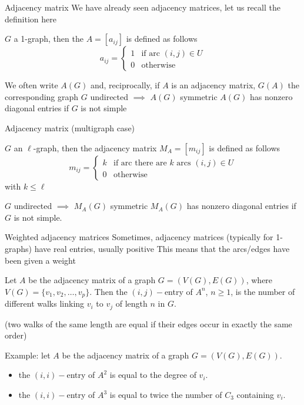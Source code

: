 \documentclass[aspectratio=43]{beamer}
\begin{document}
	
	
	
\begin{frame}{Adjacency matrix}
	We have already seen adjacency matrices, let us recall the definition here
	\begin{definition}
		$G$ a 1-graph, then the  $A=[a_{ij}]$ is defined as follows
		\[
		a_{ij} = \begin{cases}
			1 & \text{if arc } (i,j)\in U\\
			0 & \text{otherwise}
		\end{cases}
		\]
	\end{definition}
	\vfill
	We often write $A(G)$ and, reciprocally, if $A$ is an adjacency matrix, $G(A)$ the corresponding graph
	\vfill
	$G$ undirected $\implies$ $A(G)$ symmetric
	\vfill
	$A(G)$ has nonzero diagonal entries if $G$ is not simple
\end{frame}

\begin{frame}{Adjacency matrix (multigraph case)}
	\begin{definition}
		$G$ an $\ell$-graph, then the adjacency matrix $M_A=[m_{ij}]$ is defined as follows
		\[
		m_{ij} = \begin{cases}
			k & \text{if arc there are $k$ arcs } (i,j)\in U\\
			0 & \text{otherwise}
		\end{cases}
		\]
		with $k\leq \ell$
	\end{definition}
	\vfill
	$G$ undirected $\implies$ $M_A(G)$ symmetric
	\vfill
	$M_A(G)$ has nonzero diagonal entries if $G$ is not simple.
\end{frame}

\begin{frame}{Weighted adjacency matrices}
	Sometimes, adjacency matrices (typically for 1-graphs) have real entries, usually positive
	\vfill
	This means that the arcs/edges have been given a weight
\end{frame}


\begin{frame}
	\begin{theorem}
		Let $A$ be the adjacency matrix of a graph $G=(V(G),E(G))$, where $V(G)=\{v_1,v_2, \dots , v_p\}$. Then the $(i,j)-$entry of $A^n$, $n\geq 1$, is the number of different walks linking $v_i$ to $v_j$ of length $n$ in $G$.
	\end{theorem}
	(two walks of the same length are equal if their edges occur in exactly the same order)
	
	Example: let $A$ be the adjacency matrix of a graph $G=(V(G),E(G))$. 
	\begin{itemize}
		\item the $(i,i)-$entry of $A^2$ is equal to the degree of $v_i$.
		\item the $(i,i)-$entry of $A^3$ is equal to twice the number of $C_3$ containing $v_i$.
	\end{itemize}
\end{frame}
\end{document}
